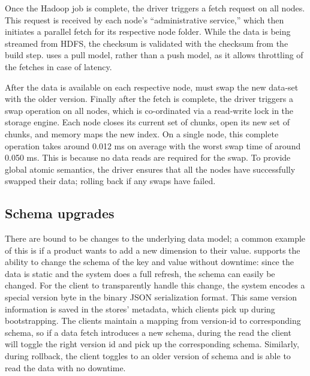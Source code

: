 Once the Hadoop job is complete, the driver triggers a fetch request
on all \projectname{} nodes. This request is received by each node's
``administrative service,'' which then initiates a parallel fetch for
its respective node folder. While the data is being streamed from
HDFS, the checksum is validated with the checksum from the build step.
\projectname{} uses a pull model, rather than a push model, as it allows
throttling of the fetches in case of latency.

After the data is available on each respective node, \projectname{} must swap
the new data-set with the older version. Finally after the fetch is
complete, the driver triggers a swap operation on all nodes, which is
co-ordinated via a read-write lock in the storage engine. Each node
closes its current set of chunks, open its new set of chunks, and
memory maps the new index. On a single node, this complete 
operation takes around 0.012 ms on average with the worst swap time of 
around 0.050 ms. This is because no data reads are required for the 
swap. To provide global atomic semantics, the driver ensures that 
all the nodes have successfully swapped their data; rolling back if 
any swaps have failed.


\subsection{Schema upgrades}
\label{sec:read_only:data_cycle:schema_upgrades}

There are bound to be changes to the underlying data model; a common
example of this is if a product wants to add a new dimension to their
value. \projectname{} supports the ability to change the schema of the
key and value without downtime: since the data is static and the
system does a full refresh, the schema can easily be changed. For the
client to transparently handle this change, the system encodes a
special version byte in the binary JSON serialization format. This
same version information is saved in the stores' metadata, which
clients pick up during bootstrapping. The clients maintain a mapping
from version-id to corresponding schema, so if a data fetch introduces
a new schema, during the read the client will toggle the right version
id and pick up the corresponding schema. Similarly, during rollback,
the client toggles to an older version of schema and is able to read
the data with no downtime. 

